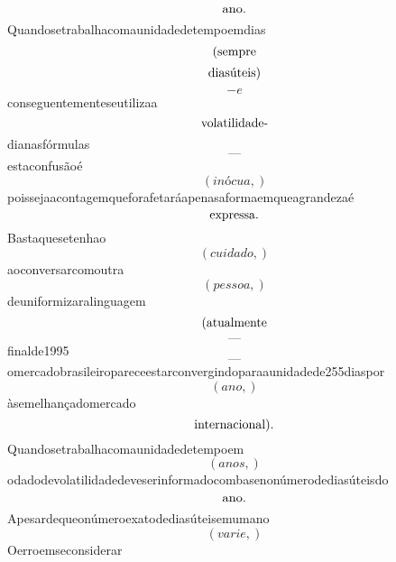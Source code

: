 \documentclass{article}
\begin{document}
\begin{equation}
$ano.$
\end{equation}Quandosetrabalhacomaunidadedetempoemdias\begin{equation}
$(sempre$
\end{equation}\begin{equation}
$diasúteis)$
\end{equation}\begin{equation}
- e
\end{equation}conseguentementeseutilizaa\begin{equation}
$volatilidade-$
\end{equation}dianasfórmulas\begin{equation}
—
\end{equation}estaconfusãoé\begin{equation}
\left( inócua,\right)
\end{equation}poissejaacontagemqueforafetaráapenasaformaemqueagrandezaé\begin{equation}
$expressa.$
\end{equation}Bastaquesetenhao\begin{equation}
\left( cuidado,\right)
\end{equation}aoconversarcomoutra\begin{equation}
\left( pessoa,\right)
\end{equation}deuniformizaralinguagem\begin{equation}
$(atualmente$
\end{equation}\begin{equation}
—
\end{equation}finalde1995\begin{equation}
—
\end{equation}omercadobrasileiropareceestarconvergindoparaaunidadede255diaspor\begin{equation}
\left( ano,\right)
\end{equation}àsemelhançadomercado\begin{equation}
$internacional).$
\end{equation}Quandosetrabalhacomaunidadedetempoem\begin{equation}
\left( anos,\right)
\end{equation}odadodevolatilidadedeveserinformadocombasenonúmerodediasúteisdo\begin{equation}
$ano.$
\end{equation}Apesardequeonúmeroexatodediasúteisemumano\begin{equation}
\left( varie,\right)
\end{equation}Oerroemseconsiderar\begin{equation}

\end{equation}
\end{document}

